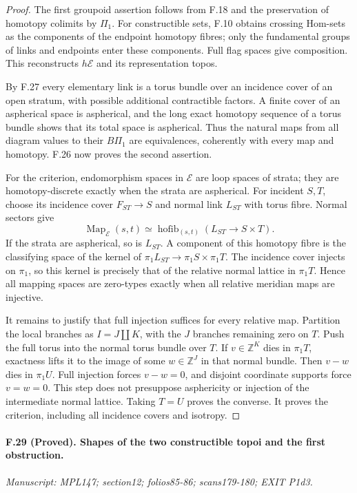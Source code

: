\begin{proof}
The first groupoid assertion follows from F.18 and the preservation
of homotopy colimits by $\Pi_1$. For constructible sets, F.10 obtains
crossing Hom-sets as the components of the endpoint homotopy fibres;
only the fundamental groups of links and endpoints enter these
components. Full flag spaces give composition. This reconstructs
$h\mathcal E$ and its representation topos.

By F.27 every elementary link is a torus bundle over an incidence
cover of an open stratum, with possible additional contractible
factors. A finite cover of an aspherical space is aspherical, and
the long exact homotopy sequence of a torus bundle shows that its
total space is aspherical. Thus the natural maps from all diagram
values to their $B\Pi_1$ are equivalences, coherently with every
map and homotopy. F.26 now proves the second assertion.

For the criterion, endomorphism spaces in $\mathcal E$ are loop
spaces of strata; they are homotopy-discrete exactly when the strata
are aspherical. For incident $S,T$, choose its incidence cover
$F_{ST}\to S$ and normal link $L_{ST}$ with torus fibre. Normal
sectors give
\[
 \operatorname{Map}_{\mathcal E}(s,t)
 \simeq\operatorname{hofib}_{(s,t)}(L_{ST}\to S\times T).
\]
If the strata are aspherical, so is $L_{ST}$. A component of this
homotopy fibre is the classifying space of the kernel of
$\pi_1L_{ST}\to\pi_1S\times\pi_1T$. The incidence cover injects
on $\pi_1$, so this kernel is precisely that of the relative normal
lattice in $\pi_1T$. Hence all mapping spaces are zero-types exactly
when all relative meridian maps are injective.

It remains to justify that full injection suffices for every relative
map. Partition the local branches as $I=J\amalg K$, with the $J$
branches remaining zero on $T$. Push the full torus into the normal
torus bundle over $T$. If $v\in\mathbb Z^K$ dies in $\pi_1T$,
exactness lifts it to the image of some $w\in\mathbb Z^J$ in that
normal bundle. Then $v-w$ dies in $\pi_1U$. Full injection forces
$v-w=0$, and disjoint coordinate supports force $v=w=0$. This step
does not presuppose asphericity or injection of the intermediate
normal lattice. Taking $T=U$ proves the converse. It proves the
criterion, including all incidence covers and isotropy.
\end{proof}

\paragraph{F.29 (Proved). Shapes of the two constructible topoi and
the first obstruction.}
\textit{Manuscript: MPL147; section12; folios85-86; scans179-180; EXIT P1d3.}

